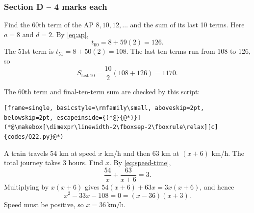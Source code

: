 \subsubsection{Section D -- 4 marks each}
\begin{enumerate}[label={},leftmargin=0pt,itemsep=9pt]
\setcounter{qcurrent}{22}\setcounter{equation}{0}
 Find the 60th term of the AP $8,10,12,\ldots$ and the sum of its last 10 terms.
\solution Here $a=8$ and $d=2$. By \eqref{eq:ap},
\begin{equation}
t_{60}=8+59(2)=\boxed{126}.
\end{equation}
The 51st term is $t_{51}=8+50(2)=108$. The last ten terms run from 108 to 126, so
\begin{equation}
S_{\mathrm{last\ 10}}=\frac{10}{2}(108+126)=\boxed{1170}.
\end{equation}



The 60th term and final-ten-term sum are checked by this script:
\begin{lstlisting}[frame=single, basicstyle=\rmfamily\small, aboveskip=2pt, belowskip=2pt, escapeinside={(*@}{@*)}]
(*@\makebox[\dimexpr\linewidth-2\fboxsep-2\fboxrule\relax][c]{codes/Q22.py}@*)
\end{lstlisting}
\setcounter{qcurrent}{23}\setcounter{equation}{0}
 A train travels 54 km at speed $x$ km/h and then 63 km at $(x+6)$ km/h. The total journey takes 3 hours. Find $x$.
\solution By \eqref{eq:speed-time},
\begin{equation}
\frac{54}{x}+\frac{63}{x+6}=3.
\end{equation}
Multiplying by $x(x+6)$ gives $54(x+6)+63x=3x(x+6)$, and hence
\begin{equation}
x^2-33x-108=0=(x-36)(x+3).
\end{equation}
Speed must be positive, so $\boxed{x=36\,\mathrm{km/h}}$.





\end{enumerate}
